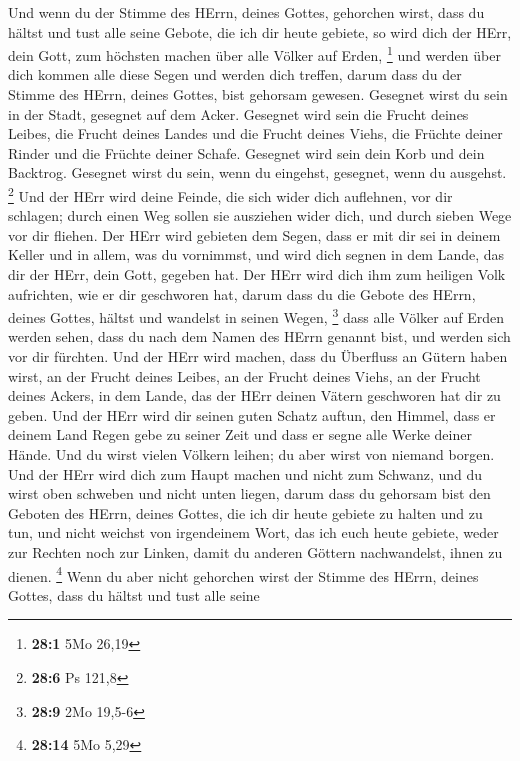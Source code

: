  Und wenn du der Stimme des HErrn, deines Gottes,
gehorchen wirst, dass du hältst und tust alle seine Gebote, die ich dir
heute gebiete, so wird dich der HErr, dein Gott, zum höchsten machen
über alle Völker auf Erden, \footnote{\textbf{28:1} 5Mo 26,19}
 und werden über dich kommen alle diese Segen und werden
dich treffen, darum dass du der Stimme des HErrn, deines Gottes, bist
gehorsam gewesen.  Gesegnet wirst du sein in der Stadt,
gesegnet auf dem Acker.  Gesegnet wird sein die Frucht
deines Leibes, die Frucht deines Landes und die Frucht deines Viehs, die
Früchte deiner Rinder und die Früchte deiner Schafe. 
Gesegnet wird sein dein Korb und dein Backtrog.  Gesegnet
wirst du sein, wenn du eingehst, gesegnet, wenn du ausgehst. \footnote{\textbf{28:6}
  Ps 121,8}  Und der HErr wird deine Feinde, die sich
wider dich auflehnen, vor dir schlagen; durch einen Weg sollen sie
ausziehen wider dich, und durch sieben Wege vor dir fliehen.
 Der HErr wird gebieten dem Segen, dass er mit dir sei in
deinem Keller und in allem, was du vornimmst, und wird dich segnen in
dem Lande, das dir der HErr, dein Gott, gegeben hat.  Der
HErr wird dich ihm zum heiligen Volk aufrichten, wie er dir geschworen
hat, darum dass du die Gebote des HErrn, deines Gottes, hältst und
wandelst in seinen Wegen, \footnote{\textbf{28:9} 2Mo 19,5-6}
 dass alle Völker auf Erden werden sehen, dass du nach
dem Namen des HErrn genannt bist, und werden sich vor dir fürchten.
 Und der HErr wird machen, dass du Überfluss an Gütern
haben wirst, an der Frucht deines Leibes, an der Frucht deines Viehs, an
der Frucht deines Ackers, in dem Lande, das der HErr deinen Vätern
geschworen hat dir zu geben.  Und der HErr wird dir
seinen guten Schatz auftun, den Himmel, dass er deinem Land Regen gebe
zu seiner Zeit und dass er segne alle Werke deiner Hände. Und du wirst
vielen Völkern leihen; du aber wirst von niemand borgen. 
Und der HErr wird dich zum Haupt machen und nicht zum Schwanz, und du
wirst oben schweben und nicht unten liegen, darum dass du gehorsam bist
den Geboten des HErrn, deines Gottes, die ich dir heute gebiete zu
halten und zu tun,  und nicht weichst von irgendeinem
Wort, das ich euch heute gebiete, weder zur Rechten noch zur Linken,
damit du anderen Göttern nachwandelst, ihnen zu dienen. \footnote{\textbf{28:14}
  5Mo 5,29}  Wenn du aber nicht gehorchen wirst der
Stimme des HErrn, deines Gottes, dass du hältst und tust alle seine
